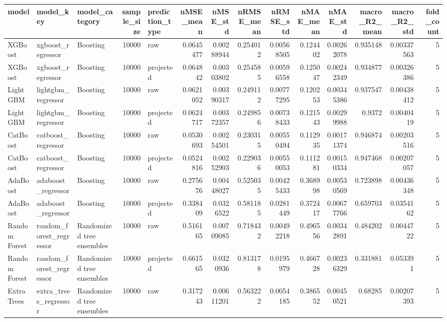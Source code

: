 \begin{tabular}{lllrlrrrrrrrrr}
\toprule
model & model\_key & model\_category & sample\_size & prediction\_type & nMSE\_mean & nMSE\_std & nRMSE\_mean & nRMSE\_std & nMAE\_mean & nMAE\_std & macro\_R2\_mean & macro\_R2\_std & fold\_count \\
\midrule
XGBoost & xgboost\_regressor & Boosting & 10000 & raw & 0.0645477 & 0.00288944 & 0.254012 & 0.00568505 & 0.124402 & 0.00262078 & 0.935148 & 0.00337563 & 5 \\
XGBoost & xgboost\_regressor & Boosting & 10000 & projected & 0.064842 & 0.00303802 & 0.254585 & 0.00596558 & 0.125047 & 0.00242349 & 0.934877 & 0.00326386 & 5 \\
LightGBM & lightgbm\_regressor & Boosting & 10000 & raw & 0.0621052 & 0.00390317 & 0.249112 & 0.00777295 & 0.120253 & 0.00345386 & 0.937547 & 0.00438412 & 5 \\
LightGBM & lightgbm\_regressor & Boosting & 10000 & projected & 0.0624717 & 0.00372357 & 0.249856 & 0.00738433 & 0.121543 & 0.00299988 & 0.9372 & 0.0040419 & 5 \\
CatBoost & catboost\_regressor & Boosting & 10000 & raw & 0.0530693 & 0.00254501 & 0.230315 & 0.00550494 & 0.112935 & 0.00171374 & 0.946874 & 0.00203516 & 5 \\
CatBoost & catboost\_regressor & Boosting & 10000 & projected & 0.0524816 & 0.00252903 & 0.229036 & 0.00550053 & 0.111281 & 0.00150334 & 0.947468 & 0.00207057 & 5 \\
AdaBoost & adaboost\_regressor & Boosting & 10000 & raw & 0.275676 & 0.00448027 & 0.525035 & 0.00425433 & 0.368998 & 0.00530569 & 0.723898 & 0.00436348 & 5 \\
AdaBoost & adaboost\_regressor & Boosting & 10000 & projected & 0.338409 & 0.0326522 & 0.581185 & 0.0281449 & 0.372417 & 0.00677766 & 0.659703 & 0.0354162 & 5 \\
Random Forest & random\_forest\_regressor & Randomized tree ensembles & 10000 & raw & 0.516165 & 0.00709085 & 0.718432 & 0.00492218 & 0.496556 & 0.00342891 & 0.484202 & 0.0044722 & 5 \\
Random Forest & random\_forest\_regressor & Randomized tree ensembles & 10000 & projected & 0.661565 & 0.0320936 & 0.813178 & 0.0195979 & 0.466728 & 0.00236329 & 0.331881 & 0.053391 & 5 \\
Extra Trees & extra\_trees\_regressor & Randomized tree ensembles & 10000 & raw & 0.317243 & 0.00611201 & 0.563222 & 0.0054185 & 0.386552 & 0.00450521 & 0.68285 & 0.00207393 & 5 \\

\end{tabular}
